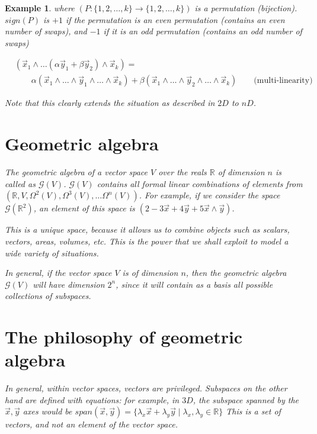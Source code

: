 \documentclass[11pt]{book}
\newcommand{\R}{\ensuremath{\mathbb R}}
\newcommand{\G}{\ensuremath{\mathcal{G}}}
\newtheorem{example}[theorem]{Example}
\begin{document}
\begin{example}
where $(P: \{1, 2, \dots, k\} \rightarrow \{1, 2, \dots, k \})$ is a
permutation (bijection). $sign(P)$ is $+1$ if the permutation is an
even permutation (contains an even number of swaps), and $-1$ if it
is an odd permutation (contains an odd number of swaps) 

\begin{align*}
    &(\vec x_1 \wedge \dots (\alpha \vec y_1 + \beta \vec y_2) \wedge \vec x_k) = \\
    &\qquad \alpha (\vec x_1 \wedge \dots \wedge \vec y_1 \wedge \dots \wedge \vec x_k) +
    \beta (\vec x_1 \wedge \dots \wedge  \vec y_2 \wedge \dots \wedge \vec x_k)
    \qquad \text{(multi-linearity)}
\end{align*}

Note that this clearly extends the situation as described in $2D$ to $nD$.


\section{Geometric algebra}

The geometric algebra of a vector space $V$ over the reals $\R$ of dimension $n$
is called as $\G(V)$. $\G(V)$ contains
all \emph{formal linear combinations} of elements from
$\left( \R, V, \Omega^2(V), \Omega^3(V), \dots \Omega^n(V) \right)$.
For example, if we consider the space $\G(\R^2)$, an element of this space 
is  $(2 -3 \vec x + 4 \vec y + 5 \vec x \wedge \vec y)$. 

This is a unique space, because it allows us to combine objects such as 
scalars, vectors, areas, volumes, etc. This is the power that we shall exploit
to model a wide variety of situations.

In general, if the vector space $V$ is of dimension $n$, then the geometric
algebra $\G(V)$ will have dimension $2^n$, since it will contain as a basis
all possible collections of subspaces.


\section{The philosophy of geometric algebra}
In general, within vector spaces, vectors are privileged. Subspaces on the
other hand are defined with equations: for example, in $3D$, the subspace
spanned by the $\vec x, \vec y$ axes would be
$span(\vec x, \vec y) =
\{ \lambda_x \vec x  + \lambda_y \vec y \mid \lambda_x, \lambda_y \in \R \}$
This is a \emph{set of vectors}, and not an \emph{element of the vector space}.


\end{example}
\end{document}
